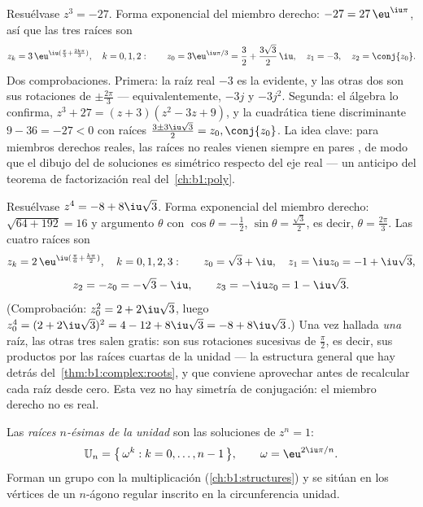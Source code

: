 \begin{example}\label{ex:b1:complex:cuberoots}
Resuélvase $z^3 = -27$. Forma exponencial del miembro derecho:
$-27 = 27\,\eu^{\iu\pi}$, así que las tres raíces son
\[
z_k = 3\,\eu^{\iu(\frac\pi3 + \frac{2k\pi}3)}, \quad k = 0, 1, 2 :
\qquad
z_0 = 3\eu^{\iu\pi/3} = \frac32 + \frac{3\sqrt3}2\,\iu,
\quad
z_1 = -3,
\quad
z_2 = \conj{z_0} .
\]
Dos comprobaciones. Primera: la raíz real $-3$ es la evidente, y las
otras dos son sus rotaciones de $\pm\frac{2\pi}3$ --- equivalentemente,
$-3j$ y $-3j^2$. Segunda: el álgebra lo confirma,
$z^3 + 27 = (z + 3)(z^2 - 3z + 9)$, y la cuadrática tiene discriminante
$9 - 36 = -27 < 0$ con raíces $\frac{3 \pm 3\iu\sqrt3}2 = z_0,
\conj{z_0}$. La idea clave: para miembros derechos reales, las raíces
no reales vienen siempre en pares , de modo que el dibujo del
 de soluciones es simétrico respecto del eje real --- un
anticipo del teorema de factorización real del~\cref{ch:b1:poly}.
\end{example}

\begin{example}\label{ex:b1:complex:fourthroots}
Resuélvase $z^4 = -8 + 8\iu\sqrt3$. Forma exponencial del miembro
derecho:  $\sqrt{64 + 192} = 16$ y argumento $\theta$ con
$\cos\theta = -\frac12$, $\sin\theta = \frac{\sqrt3}2$, es decir,
$\theta = \frac{2\pi}3$. Las cuatro raíces son
\[
z_k = 2\,\eu^{\iu(\frac\pi6 + \frac{k\pi}2)}, \quad k = 0, 1, 2,
3 :
\qquad
z_0 = \sqrt3 + \iu,\quad z_1 = \iu z_0 = -1 + \iu\sqrt3,
\]
\[
z_2 = -z_0 = -\sqrt3 - \iu,\qquad z_3 = -\iu z_0 = 1 - \iu\sqrt3 .
\]
(Comprobación: $z_0^2 = 2 + 2\iu\sqrt3$, luego $z_0^4 = (2 +
2\iu\sqrt3)^2 = 4 - 12 + 8\iu\sqrt3 = -8 + 8\iu\sqrt3$.) Una vez
hallada \emph{una} raíz, las otras tres salen gratis: son sus
rotaciones sucesivas de $\frac\pi2$, es decir, sus productos por las
raíces cuartas de la unidad --- la estructura general que hay detrás
del~\cref{thm:b1:complex:roots}, y que conviene aprovechar antes de
recalcular cada raíz desde cero. Esta vez no hay simetría de
conjugación: el miembro derecho no es real.
\end{example}

\begin{definition}\label{def:b1:complex:unity}
Las \emph{raíces $n$-ésimas de la unidad}
son las soluciones de $z^n = 1$:
\[
\mathbb{U}_n = \bigl\{\, \omega^k : k = 0, \dots, n-1 \,\bigr\},
\qquad \omega = \eu^{2\iu\pi/n}.
\]
Forman un grupo con la multiplicación (\cref{ch:b1:structures}) y se
sitúan en los vértices de un $n$-ágono regular inscrito en la
circunferencia unidad.
\end{definition}

